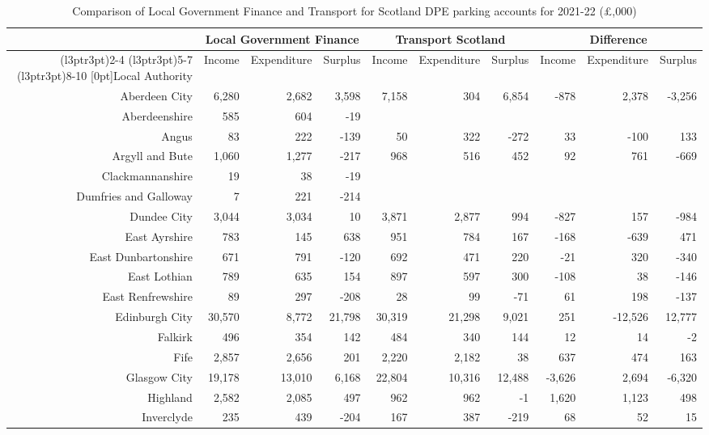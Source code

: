 \documentclass[
  12pt,
]{article}
\begin{document}
\begin{landscape}
\begin{table}[H]
\caption{\label{tab:comparetab}Comparison of Local Government Finance and Transport for Scotland DPE parking accounts for 2021-22 (£,000)}
\centering
\fontsize{7}{9}\selectfont
\begin{tabular}[t]{rrrrrrrrrr}
\toprule
\multicolumn{1}{c}{ } & \multicolumn{3}{c}{Local Government Finance} & \multicolumn{3}{c}{Transport Scotland} & \multicolumn{3}{c}{Difference} \\
\cmidrule(l{3pt}r{3pt}){2-4} \cmidrule(l{3pt}r{3pt}){5-7} \cmidrule(l{3pt}r{3pt}){8-10}
\multirow{1}{*}[0pt]{Local Authority} & Income & Expenditure & Surplus & Income & Expenditure & Surplus & Income & Expenditure & Surplus\\
\midrule
Aberdeen City & 6,280 & 2,682 & 3,598 & 7,158 & 304 & 6,854 & -878 & 2,378 & -3,256\\
Aberdeenshire & 585 & 604 & -19 &  &  &  &  &  & \\
Angus & 83 & 222 & -139 & 50 & 322 & -272 & 33 & -100 & 133\\
Argyll and Bute & 1,060 & 1,277 & -217 & 968 & 516 & 452 & 92 & 761 & -669\\
Clackmannanshire & 19 & 38 & -19 &  &  &  &  &  & \\
Dumfries and Galloway & 7 & 221 & -214 &  &  &  &  &  & \\
Dundee City & 3,044 & 3,034 & 10 & 3,871 & 2,877 & 994 & -827 & 157 & -984\\
East Ayrshire & 783 & 145 & 638 & 951 & 784 & 167 & -168 & -639 & 471\\
East Dunbartonshire & 671 & 791 & -120 & 692 & 471 & 220 & -21 & 320 & -340\\
East Lothian & 789 & 635 & 154 & 897 & 597 & 300 & -108 & 38 & -146\\
East Renfrewshire & 89 & 297 & -208 & 28 & 99 & -71 & 61 & 198 & -137\\
Edinburgh City & 30,570 & 8,772 & 21,798 & 30,319 & 21,298 & 9,021 & 251 & -12,526 & 12,777\\
Falkirk & 496 & 354 & 142 & 484 & 340 & 144 & 12 & 14 & -2\\
Fife & 2,857 & 2,656 & 201 & 2,220 & 2,182 & 38 & 637 & 474 & 163\\
Glasgow City & 19,178 & 13,010 & 6,168 & 22,804 & 10,316 & 12,488 & -3,626 & 2,694 & -6,320\\
Highland & 2,582 & 2,085 & 497 & 962 & 962 & -1 & 1,620 & 1,123 & 498\\
Inverclyde & 235 & 439 & -204 & 167 & 387 & -219 & 68 & 52 & 15\\

\end{tabular}
\end{table}
\end{landscape}
\end{document}
